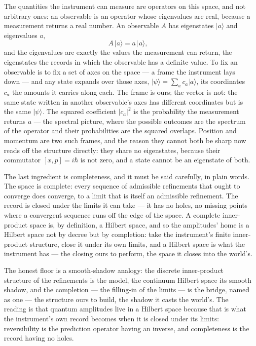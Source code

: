 The quantities the instrument can measure are operators on this space, and not arbitrary ones: an observable
is an operator whose eigenvalues are real, because a measurement returns a real number. An observable $A$ has
eigenstates $\lvert a\rangle$ and eigenvalues $a$,
\begin{equation}
  A\,\lvert a\rangle = a\,\lvert a\rangle,
\end{equation}
and the eigenvalues are exactly the values the measurement can return, the eigenstates the records in which
the observable has a definite value. To fix an observable is to fix a set of axes on the space --- a frame the
instrument lays down --- and any state expands over those axes, $\lvert \psi\rangle = \sum_a c_a \lvert
a\rangle$, its coordinates $c_a$ the amounts it carries along each. The frame is ours; the vector is not: the
same state written in another observable's axes has different coordinates but is the same $\lvert \psi\rangle$.
The squared coefficient $|c_a|^2$ is the probability the measurement returns $a$ --- the spectral picture,
where the possible outcomes are the spectrum of the operator and their probabilities are the squared overlaps.
Position and momentum are two such frames, and the reason they cannot both be sharp now reads off the
structure directly: they share no eigenstates, because their
commutator $[x,p] = i\hbar$ is not zero, and a state cannot be an eigenstate of both.

The last ingredient is completeness, and it must be said carefully, in plain words. The space is complete:
every sequence of admissible refinements that ought to converge does converge, to a limit that is itself an
admissible refinement. The record is closed under the limits it can take --- it has no holes, no missing
points where a convergent sequence runs off the edge of the space. A complete inner-product space is, by
definition, a Hilbert space, and so the amplitudes' home is a Hilbert space not by decree but by completion:
take the instrument's finite inner-product structure, close it under its own limits, and a Hilbert space is
what the instrument has --- the closing ours to perform, the space it closes into the world's.

The honest floor is a smooth-shadow analogy: the discrete inner-product structure of the refinements is the
model, the continuum Hilbert space its smooth shadow, and the completion --- the filling-in of the limits ---
is the bridge, named as one --- the structure ours to build, the shadow it casts the world's. The reading is
that quantum amplitudes live in a Hilbert space because that is
what the instrument's own record becomes when it is closed under its limits: reversibility is the prediction
operator having an inverse, and completeness is the record having no holes.

